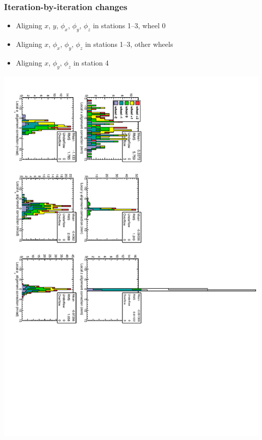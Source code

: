 \documentclass[compress]{beamer}
\begin{document}
\begin{frame}
\frametitle{Iteration-by-iteration changes}

\begin{itemize}
\item Aligning $x$, $y$, $\phi_x$, $\phi_y$, $\phi_z$ in stations 1--3, wheel 0
\item Aligning $x$, $\phi_x$, $\phi_y$, $\phi_z$ in stations 1--3, other wheels
\item Aligning $x$, $\phi_y$, $\phi_z$ in station 4
\end{itemize}

\vfill
\includegraphics[height=\linewidth, angle=90]{data_100GeV_newinternal_iter1.pdf}
\end{frame}
\end{document}
